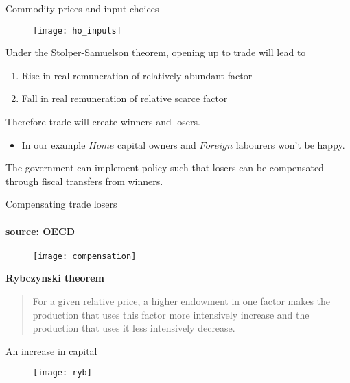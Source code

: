 \documentclass{beamer}
\begin{document}
\begin{frame}{Commodity prices and input choices}
  \begin{figure}
    \texttt{[image: ho\_inputs]}
  \end{figure}
\end{frame}

\begin{frame}
  Under the Stolper-Samuelson theorem, opening up to trade will lead to
  \begin{enumerate}
    \item Rise in real remuneration of relatively abundant factor
    \item Fall in real remuneration of relative scarce factor
  \end{enumerate}
  \medskip
  Therefore trade will create winners and losers. 
  \begin{itemize}
    \item In our example $Home$ capital owners and $Foreign$ labourers won't be happy.
  \end{itemize}
  \medskip
  The government can implement policy such that losers can be compensated through fiscal transfers from winners. 
\end{frame}

  \begin{frame}{Compensating trade losers}
\framesubtitle{source: OECD}
  \begin{figure}
    \texttt{[image: compensation]}
  \end{figure}
\end{frame}

\begin{frame}
  \textbf{Rybczynski theorem}
  \begin{quote}
  For a given relative price, a higher endowment in one factor makes the production that uses this factor more intensively increase and the production that uses it less intensively decrease.  
  \end{quote}
\end{frame}

\begin{frame}{An increase in capital}
  \begin{figure}
    \texttt{[image: ryb]}
  \end{figure}  
\end{frame}
\end{document}
